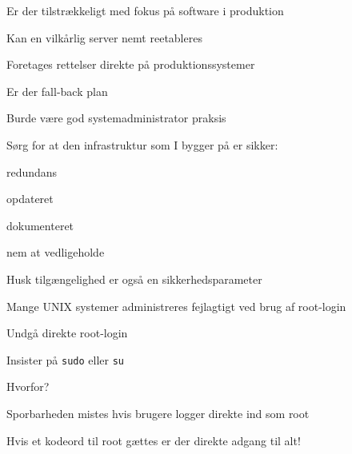 \documentclass[Screen16to9,17pt]{foils}
\begin{document}
\begin{list1}
\item Er der tilstrækkeligt med fokus på software i produktion
\item Kan en vilkårlig server nemt reetableres
\item Foretages rettelser direkte på produktionssystemer
\item Er der fall-back plan
\item Burde være god systemadministrator praksis
\end{list1}




\begin{list1}
\item Sørg for at den infrastruktur som I bygger på er sikker:
\begin{list2}
 \item redundans
       \item opdateret
        \item dokumenteret
        \item nem at vedligeholde
\end{list2}

\item  Husk tilgængelighed er også en sikkerhedsparameter
\end{list1}




\begin{list1}
\item Mange UNIX systemer administreres fejlagtigt ved brug af
  root-login
\item Undgå direkte root-login
\item Insister på \verb+sudo+ eller \verb+su+
\item Hvorfor?
\begin{list2}
\item Sporbarheden mistes hvis brugere logger direkte ind som root
\item Hvis et kodeord til root gættes er der direkte adgang til alt!
\end{list2}
\end{list1}


\slidenext
\end{document}
